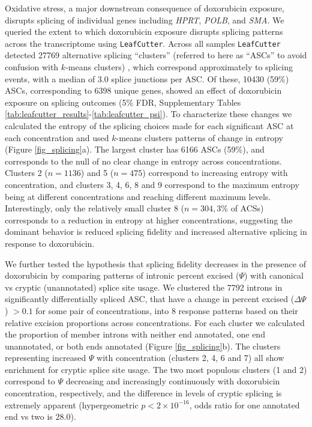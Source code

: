 \documentclass{article}
\begin{document}
Oxidative stress, a major downstream consequence of doxorubicin exposure, disrupts splicing of individual genes including \emph{HPRT}, \emph{POLB}\cite{Disher2007}, and \emph{SMA}\cite{Seo2016}. We queried the extent to which doxorubicin exposure disrupts splicing patterns across the transcriptome using \texttt{LeafCutter}\cite{LeafCutter}. Across all samples \texttt{LeafCutter} detected 27769 alternative splicing ``clusters'' (referred to here as ``ASCs'' to avoid confusion with $k$-means clusters) , which correspond approximately to splicing events, with a median of 3.0 splice junctions per ASC. Of these, 10430 (59\%) ASCs, corresponding to 6398 unique genes, showed an effect of doxorubicin exposure on splicing outcomes (5\% FDR, Supplementary Tables \ref{tab:leafcutter_results}-\ref{tab:leafcutter_psi}). To characterize these changes we calculated the entropy of the splicing choices made for each significant ASC at each concentration and used $k$-means clusters patterns of change in entropy (Figure \ref{fig_splicing}a). The largest cluster has 6166 ASCs (59\%), and corresponds to the null of no clear change in entropy across concentrations. Clusters 2 ($n=1136$) and 5 ($n=475$) correspond to increasing entropy with concentration, and clusters 3, 4, 6, 8 and 9 correspond to the maximum entropy being at different concentrations and reaching different maximum levels. Interestingly, only the relatively small cluster 8 ($n=304, 3\%$ of ACSs) corresponds to a reduction in entropy at higher  concentrations, suggesting the dominant behavior is reduced splicing fidelity and increased alternative splicing in response to doxorubicin. 

We further tested the hypothesis that splicing fidelity decreases in the presence of doxorubicin by comparing patterns of intronic percent excised ($\Psi$) with canonical vs cryptic (unannotated) splice site usage. We clustered the 7792 introns in significantly differentially spliced ASC, that have a change in percent excised ($\Delta \Psi$) $ > 0.1$ for some pair of concentrations, into 8 response patterns based on their relative excision proportions across concentrations. For each cluster we calculated the proportion of member introns with neither end annotated, one end unannotated, or both ends annotated (Figure \ref{fig_splicing}b). The clusters representing increased $\Psi$ with concentration (clusters 2, 4, 6 and 7) all show enrichment for cryptic splice site usage. The two most populous clusters (1 and 2) correspond to $\Psi$ decreasing and increasingly continuously with doxorubicin concentration, respectively, and the difference in levels of cryptic splicing is extremely apparent (hypergeometric $p < 2 \times 10^{-16}$, odds ratio for one annotated end vs two is $28.0$).
\end{document}

